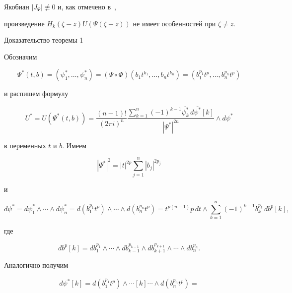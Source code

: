 Якобиан $|J_{\Psi}|\not\equiv0$ и, как отмечено в~\cite{M},


произведение $H_k(\zeta-z)U(\Psi(\zeta-z))$ не имеет особенностей при $\zeta\ne


z$.


\medskip





\begin{pf*}{Доказательство теоремы 1}


Обозначим


$$


\Psi^*(t,b)=(\psi_1^*,\dotsc,\psi_n^*)=


(\Psi\circ\Phi)(b_1t^{k_1},\dotsc,b_nt^{k_n})=(b_1^{p_1}t^p,


\dotsc,b_n^{p_n}t^p)


$$


и распишем формулу


$$


U^*=U(\Psi^*(t,b))=\frac{(n-1)!}{(2\pi i)^n}


\frac{\sum\limits_{k=1}^n(-1)^{k-1}


\overline{\psi^*_k}\,d\overline{\psi^*}[k]}{|\Psi^*|^{2n}}\wedge d\psi^*


$$


в переменных $t$ и $b$. Имеем


$$


|\Psi^*|^2=|t|^{2p}\sum_{j=1}^n|b_j|^{2p_j}


$$


и


$$


d\psi^*=d\psi_1^*\wedge\dotsb\wedge d\psi_n^*=d(b_1^{p_1}t^p)


\wedge\dotsb\wedge d(b_n^{p_n}t^p)=


t^{p(n-1)}p\,dt\wedge\sum_{k=1}^n(-1)^{k-1}b_k^{p_k}\,db^p[k],


$$


где


$$


db^p[k]=db_1^{p_1}\wedge\dotsb\wedge db_{k-1}^{p_{k-1}}\wedge db_{k+1}^{p_{k


+1}}\wedge\dotsb\wedge db_n^{p_n}.


$$


Аналогично получим


\begin{multline*}


d\psi^*[k]=d(b_1^{p_1}t^p)\wedge\dotsb[k]\dotsb\wedge d(b_n^{p_n}t^p)= \\



\end{multline*}
\end{pf*}
